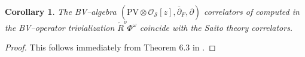 \documentclass[12pt,a4paper]{amsart}
\newcommand{\CC}{{\mathbb{C}}}
\def\O{{\mathcal O}}
\renewcommand{\S}{{\mathcal S}}
\newcommand{\p}{{\partial}}
\newcommand{\<}{\left<}
\renewcommand{\>}{\right>}
\newcommand{\PV}{{\mathrm{PV}}}
\newtheorem{lemma}[theorem]{Lemma}
\newtheorem{corollary}[theorem]{Corollary}
\numberwithin{equation}{section}
\begin{document}
\begin{corollary}
    The BV--algebra $(\PV \otimes \O_\S[z],\overline\p_F,\p)$ correlators of \cite{KMS} computed in the BV--operator trivialization $\widetilde R^o \Phi^\omega$ coincide with the Saito theory correlators.
\end{corollary}
\begin{proof}
 This follows immediately from Theorem 6.3 in \cite{KMS}.
\end{proof}
%
%
%
%
%
%
\end{document}
